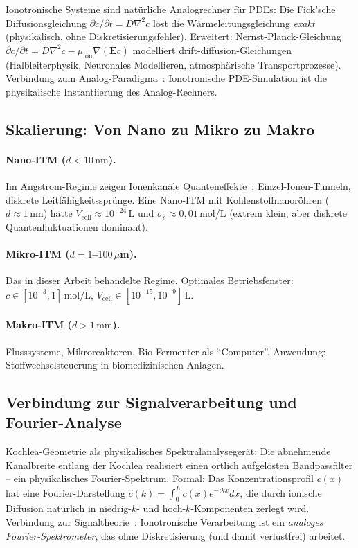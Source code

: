 ﻿\documentclass[a4paper,12pt]{article}
\theoremstyle{plain}
\theoremstyle{definition}
\theoremstyle{remark}
\begin{document}
Ionotronische Systeme sind nat\"urliche Analogrechner f\"ur PDEs:
Die Fick'sche Diffusionsgleichung $\partial c/\partial t = D\nabla^2 c$
l\"ost die W\"armeleitungsgleichung \emph{exakt} (physikalisch, ohne Diskretisierungsfehler).
Erweitert: Nernst-Planck-Gleichung
$\partial c/\partial t = D\nabla^2 c - \mu_{\mathrm{ion}} \nabla(\mathbf{E}c)$
modelliert drift-diffusion-Gleichungen (Halbleiterphysik, Neuronales Modellieren,
atmosph\"arische Transportprozesse).
Verbindung zum Analog-Paradigma~\cite{epp2026analog}: Ionotronische
PDE-Simulation ist die physikalische Instantiierung des Analog-Rechners.

\subsection{Skalierung: Von Nano zu Mikro zu Makro}

\paragraph{Nano-ITM ($d < 10\,\text{nm}$).}
Im Angstrom-Regime zeigen Ionenkan\"ale Quanteneffekte~\cite{bocquet2020}:
Einzel-Ionen-Tunneln, diskrete Leitf\"ahigkeitssprünge.
Eine Nano-ITM mit Kohlenstoffnanor\"ohren ($d \approx 1\,\text{nm}$) h\"atte
$V_{\mathrm{cell}} \approx 10^{-24}\,$L und $\sigma_c \approx 0{,}01\,$mol/L
(extrem klein, aber diskrete Quantenfluktuationen dominant).

\paragraph{Mikro-ITM ($d = 1$--$100\,\mu$m).}
Das in dieser Arbeit behandelte Regime.
Optimales Betriebsfenster: $c \in [10^{-3}, 1]\,\text{mol/L}$,
$V_{\mathrm{cell}} \in [10^{-15}, 10^{-9}]\,\text{L}$.

\paragraph{Makro-ITM ($d > 1\,\text{mm}$).}
Flusssysteme, Mikroreaktoren, Bio-Fermenter als ``Computer''.
Anwendung: Stoffwechselsteuerung in biomedizinischen Anlagen.

\subsection{Verbindung zur Signalverarbeitung und Fourier-Analyse}

Kochlea-Geometrie als physikalisches Spektralanalyseger\"at:
Die abnehmende Kanalbreite entlang der Kochlea realisiert einen
\"ortlich aufgel\"osten Bandpassfilter -- ein physikalisches Fourier-Spektrum.
Formal: Das Konzentrationsprofil $c(x)$ hat eine Fourier-Darstellung
$\hat{c}(k) = \int_0^L c(x) e^{-ikx} dx$, die durch ionische Diffusion
nat\"urlich in niedrig-$k$- und hoch-$k$-Komponenten zerlegt wird.
Verbindung zur Signaltheorie~\cite{epp2026signalth}:
Ionotronische Verarbeitung ist ein \emph{analoges Fourier-Spektrometer},
das ohne Diskretisierung (und damit verlustfrei) arbeitet.
\end{document}
